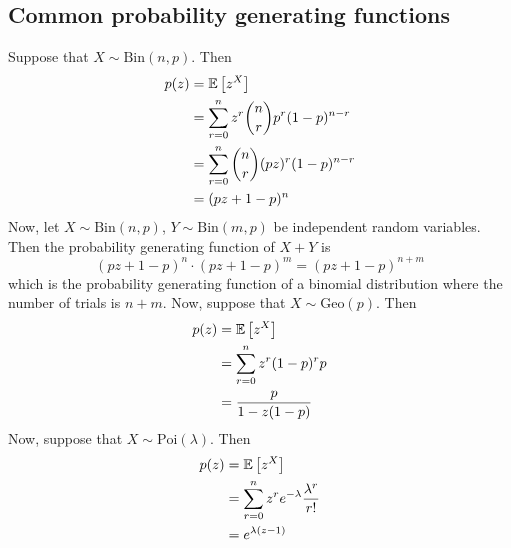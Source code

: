 \subsection{Common probability generating functions}
Suppose that \(X \sim \mathrm{Bin}(n, p)\).
Then
\begin{align*}
	p(z) & = \mathbb{E}\left[{z^X}\right]                                  \\
	     & = \sum_{r=0}^n z^r \binom{n}{r} p^r (1-p)^{n-r} \\
	     & = \sum_{r=0}^n \binom{n}{r} (pz)^r (1-p)^{n-r}  \\
	     & = (pz + 1 - p)^{n}
\end{align*}
Now, let \(X \sim \mathrm{Bin}(n, p)\), \(Y \sim \mathrm{Bin}(m, p)\) be independent random variables.
Then the probability generating function of \(X+Y\) is
\[
	(pz + 1 - p)^{n} \cdot (pz + 1 - p)^{m} = (pz + 1 - p)^{n+m}
\]
which is the probability generating function of a binomial distribution where the number of trials is \(n+m\).
Now, suppose that \(X \sim \mathrm{Geo}(p)\).
Then
\begin{align*}
	p(z) & = \mathbb{E}\left[{z^X}\right]               \\
	     & = \sum_{r=0}^n z^r (1-p)^r p \\
	     & = \frac{p}{1-z(1-p)}         \\
\end{align*}
Now, suppose that \(X \sim \mathrm{Poi}(\lambda)\).
Then
\begin{align*}
	p(z) & = \mathbb{E}\left[{z^X}\right]                                       \\
	     & = \sum_{r=0}^n z^r e^{-\lambda} \frac{\lambda^r}{r!} \\
	     & = e^{\lambda(z-1)}                                   \\
\end{align*}


